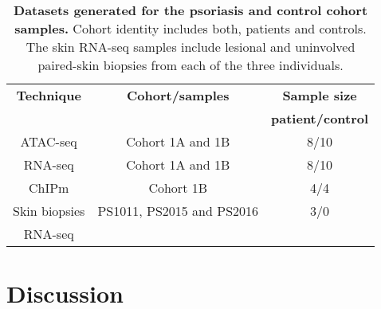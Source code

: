 \begin{table}[htbp]
\centering
\begin{tabular}{@{} c c c}
\toprule
\textbf{Technique} & \textbf{Cohort/samples} & \textbf{Sample size}      \\
                   &                         & \textbf{patient/control} \\
\midrule
\midrule
ATAC-seq      & Cohort 1A and 1B &  8/10 \\
RNA-seq       & Cohort 1A and 1B &  8/10 \\
ChIPm         & Cohort 1B        &  4/4   \\
Skin biopsies & PS1011, PS2015 and PS2016 & 3/0\\
RNA-seq       &                           & \\
\bottomrule
\end{tabular}
\medskip %
\caption[Datasets generated for the psoriasis and control cohort samples.]{\textbf{Datasets generated for the psoriasis and control cohort samples.} Cohort identity includes both, patients and controls. The skin RNA-seq samples include lesional and uninvolved paired-skin biopsies from each of the three individuals.}
\label{tab:Psoriasis_controls_datasets_per_sample}
\end{table}
\bigskip %



\section{Discussion}
%






